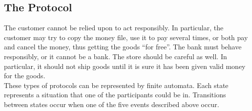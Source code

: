 \documentclass[]{article}
\begin{document}
  \subsection*{The Protocol}
    The customer cannot be relied upon to act responsibly. In particular, the 
    customer may try to copy the money file, use it to pay several times, or 
    both pay and cancel the money, thus getting the goods ``for free''. The 
    bank must behave responsibly, or it cannot be a bank. The store should be 
    careful as well. In particular, it should not ship goods until it is sure 
    it has been given valid money for the goods. \\
    \indent These types of protocols can be represented by finite automata. 
    Each state represents a situation that one of the participants could be 
    in. Transitions between states occur when one of the five events described 
    above occur.
\end{document}
